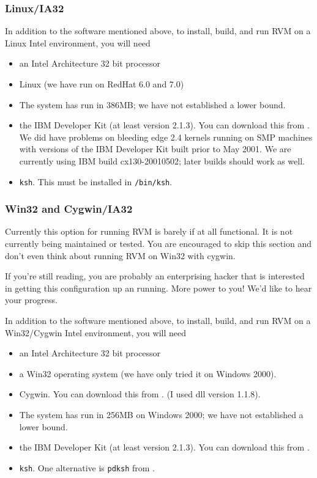 \subsubsection{Linux/IA32}
In addition to the software mentioned above, to install, build, and
run RVM on a Linux Intel environment, you will need 
\begin{itemize}
\item an Intel Architecture 32 bit processor
\item Linux  (we have run on RedHat 6.0 and 7.0)
\item The system has run in 386MB; we have not established a lower bound.
\item the IBM Developer Kit (at least version 2.1.3).  You can download this from
\xlink{{\tt \LinuxJdkURL}} {\LinuxJdkURL}.  We did have problems on
bleeding edge 2.4 kernels running on SMP machines with versions of the IBM
Developer Kit built prior to May 2001.  We are currently using IBM
build cx130-20010502; later builds should work as well.
\item {\tt ksh}. This must be installed in {\tt /bin/ksh}.
\end{itemize}

\subsubsection{Win32 and Cygwin/IA32}
Currently this option for running RVM is barely if at all functional.
It is not currently being maintained or tested. You are encouraged to 
skip this section and don't even think about running RVM on Win32 with 
cygwin.

If you're still reading, you are probably an enterprising hacker that is
interested in getting this configuration up an running.  More power to
you! We'd like to hear your progress.

In addition to the software mentioned above, to install, build, and
run RVM on a Win32/Cygwin Intel environment, you will need 
\begin{itemize}
\item an Intel Architecture 32 bit processor
\item a Win32 operating system (we have only tried it on Windows 2000).
\item Cygwin. You can download this from 
\xlink{{\tt \CygwinURL}} {\CygwinURL}. (I used dll version 1.1.8).
\item The system has run in 256MB on Windows 2000; we have not established
a lower bound.
\item the IBM Developer Kit (at least version 2.1.3).  You can download this from
\xlink{{\tt \WinJdkURL}} {\WinJdkURL}.
\item {\tt ksh}.  One alternative is {\tt pdksh} from 
\xlink{{\tt \pdkshURL}} {\pdkshURL}.
\end{itemize}

